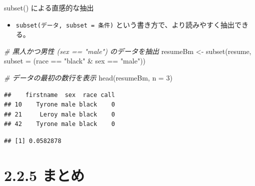 \documentclass[
  ignorenonframetext,
]{beamer}
\newenvironment{Shaded}{\begin{snugshade}}{\end{snugshade}}
\newcommand{\AttributeTok}[1]{\textcolor[rgb]{0.77,0.63,0.00}{#1}}
\newcommand{\CommentTok}[1]{\textcolor[rgb]{0.56,0.35,0.01}{\textit{#1}}}
\newcommand{\DecValTok}[1]{\textcolor[rgb]{0.00,0.00,0.81}{#1}}
\newcommand{\FunctionTok}[1]{\textcolor[rgb]{0.00,0.00,0.00}{#1}}
\newcommand{\NormalTok}[1]{#1}
\newcommand{\OtherTok}[1]{\textcolor[rgb]{0.56,0.35,0.01}{#1}}
\newcommand{\SpecialCharTok}[1]{\textcolor[rgb]{0.00,0.00,0.00}{#1}}
\newcommand{\StringTok}[1]{\textcolor[rgb]{0.31,0.60,0.02}{#1}}
\providecommand{\tightlist}{%
  \setlength{\itemsep}{0pt}\setlength{\parskip}{0pt}}
\begin{document}
\begin{frame}[fragile]{subset() による直感的な抽出}
\protect\hypertarget{subset-ux306bux3088ux308bux76f4ux611fux7684ux306aux62bdux51fa}{}
\begin{itemize}
\tightlist
\item
  \texttt{subset(データ,\ subset\ =\ 条件)}
  という書き方で、より読みやすく抽出できる。
\end{itemize}

\scriptsize

\begin{Shaded}
\begin{Highlighting}[]
\CommentTok{\# 黒人かつ男性 (sex == "male") のデータを抽出}
\NormalTok{resumeBm }\OtherTok{\textless{}{-}} \FunctionTok{subset}\NormalTok{(resume, }\AttributeTok{subset =}\NormalTok{ (race }\SpecialCharTok{==} \StringTok{"black"} \SpecialCharTok{\&}\NormalTok{ sex }\SpecialCharTok{==} \StringTok{"male"}\NormalTok{))}

\CommentTok{\# データの最初の数行を表示}
\FunctionTok{head}\NormalTok{(resumeBm, }\AttributeTok{n =} \DecValTok{3}\NormalTok{)}
\end{Highlighting}
\end{Shaded}

\begin{verbatim}
##    firstname  sex  race call
## 10    Tyrone male black    0
## 21     Leroy male black    0
## 42    Tyrone male black    0
\end{verbatim}

\begin{Shaded}
\end{Shaded}

\begin{verbatim}
## [1] 0.0582878
\end{verbatim}

\normalsize
\end{frame}

\hypertarget{ux307eux3068ux3081}{%
\section{2.2.5 まとめ}\label{ux307eux3068ux3081}}
\end{document}
